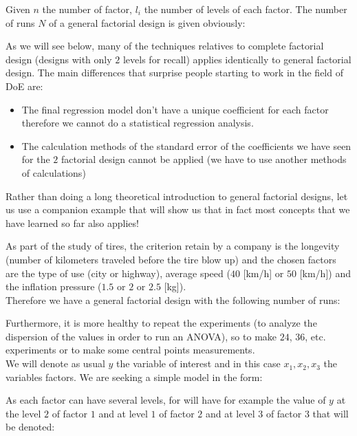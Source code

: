 	Given $n$ the number of factor, $l_i$ the number of levels of each factor. The number of runs $N$ of a general factorial design is given obviously:
	
	As we will see below, many of the techniques relatives to complete factorial design (designs with only $2$ levels for recall) applies identically to general factorial design. The main differences that surprise people starting to work in the field of DoE are:
	\begin{itemize}
		\item The final regression model don't have a unique coefficient for each factor therefore we cannot do a statistical regression analysis.
		
		\item The calculation methods of the standard error of the coefficients we have seen for the $2$ factorial design cannot be applied (we have to use another methods of calculations)
	\end{itemize}

	Rather than doing a long theoretical introduction to general factorial designs, let us use a companion example that will show us that in fact most concepts that we have learned so far also applies!
	
	As part of the study of tires, the criterion retain by a company is the longevity (number of kilometers traveled before the tire blow up) and the chosen factors are the type of use (city or highway), average speed ($40$ [km/h] or $50$ [km/h]) and the inflation pressure ($1.5$ or $2$ or $2.5$ [kg]).\\
	
	Therefore we have a general factorial design with the following number of runs:
	
 	Furthermore, it is more healthy to repeat the experiments (to analyze the dispersion of the values in order to run an ANOVA), so to make $24$, $36$, etc. experiments or to make some central points measurements.\\

	We will denote as usual $y$ the variable of interest and in this case $x_1,x_2,x_3$ the variables factors. We are seeking a simple model in the form:
	
	As each factor can have several levels, for will have for example the value of $y$ at the level $2$ of factor $1$ and at level $1$ of factor $2$ and at level $3$ of factor $3$ that will be denoted:
	
